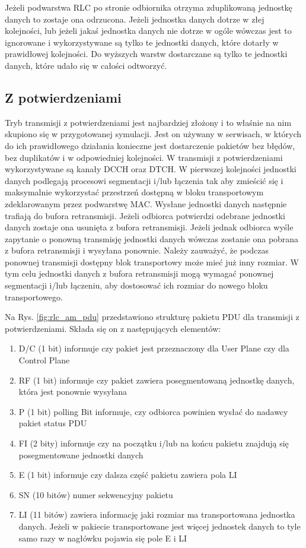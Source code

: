  Jeżeli podwarstwa RLC po stronie odbiornika otrzyma zduplikowaną jednostkę danych to zostaje ona odrzucona. Jeżeli jednostka danych dotrze w złej kolejności, lub jeżeli jakaś jednostka danych nie dotrze w ogóle wówczas jest to ignorowane i wykorzystywane są tylko te jednostki danych, które dotarły w prawidłowej kolejności. Do wyższych warstw dostarczane są tylko te jednostki danych, które udało się w całości odtworzyć. 

\subsection{Z potwierdzeniami}
\label{subsec:am}

Tryb transmisji z potwierdzeniami jest najbardziej złożony i to właśnie na nim skupiono się w przygotowanej symulacji. Jest on używany w serwisach, w których do ich prawidłowego działania konieczne jest dostarczenie pakietów bez błędów, bez duplikatów i w odpowiedniej kolejności. W transmisji z potwierdzeniami wykorzystywane są kanały DCCH oraz DTCH. W pierwszej kolejności jednostki danych podlegają procesowi segmentacji i/lub łączenia tak aby zmieścić się i maksymalnie wykorzystać przestrzeń dostępną w bloku transportowym zdeklarowanym przez podwarstwę MAC. Wysłane jednostki danych następnie trafiają do bufora retransmisji. Jeżeli odbiorca potwierdzi odebrane jednostki danych zostaje ona usunięta z bufora retransmisji. Jeżeli jednak odbiorca wyśle zapytanie o ponowną transmisję jednostki danych wówczas zostanie ona pobrana z bufora retransmisji i wysyłana ponownie. Należy zauważyć, że podczas ponownej transmisji dostępny blok transportowy może mieć już inny rozmiar. W tym celu jednostki danych z bufora retransmisji mogą wymagać ponownej segmentacji i/lub łączeniu, aby dostosować ich rozmiar do nowego bloku transportowego.

Na Rys. \ref{fig:rlc_am_pdu} przedstawiono strukturę pakietu PDU dla transmisji z potwierdzeniami. Składa się on z następujących elementów:

\begin{enumerate}
	\item D/C (1 bit) informuje czy pakiet jest przeznaczony dla User Plane czy dla Control Plane
	\item RF (1 bit) informuje czy pakiet zawiera posegmentowaną jednostkę danych, która jest ponownie wysyłana
	\item P (1 bit) polling Bit informuje, czy odbiorca powinien wysłać do nadawcy pakiet status PDU
	\item FI (2 bity) informuje czy na początku i/lub na końcu pakietu znajdują się posegmentowane jednostki danych
	\item E (1 bit) informuje czy dalsza część pakietu zawiera pola LI
	\item SN (10 bitów) numer sekwencyjny pakietu
	\item LI (11 bitów) zawiera informację jaki rozmiar ma transportowana jednostka danych. Jeżeli w pakiecie transportowane jest więcej jednostek danych to tyle samo razy w nagłówku pojawia się pole E i LI
\end{enumerate}

